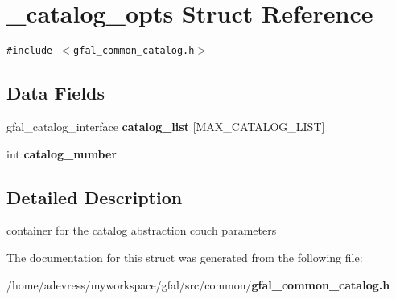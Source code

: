 \section{\_\-catalog\_\-opts Struct Reference}
\label{struct__catalog__opts}
{\tt \#include $<$gfal\_\-common\_\-catalog.h$>$}

\subsection*{Data Fields}
\begin{CompactItemize}
\item 
gfal\_\-catalog\_\-interface \textbf{catalog\_\-list} [MAX\_\-CATALOG\_\-LIST]\label{struct__catalog__opts_697c5a1807ecc48b1a7605785627e8b2}

\item 
int \textbf{catalog\_\-number}\label{struct__catalog__opts_526de1a9121c7c0b31f0c3b8967c5e38}

\end{CompactItemize}


\subsection{Detailed Description}
container for the catalog abstraction couch parameters 



The documentation for this struct was generated from the following file:\begin{CompactItemize}
\item 
/home/adevress/myworkspace/gfal/src/common/\bf{gfal\_\-common\_\-catalog.h}\end{CompactItemize}
